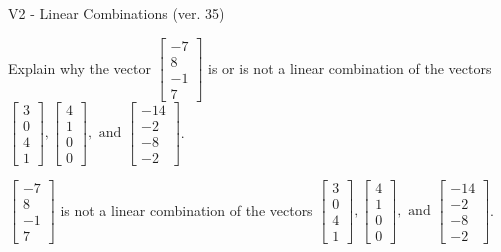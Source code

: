 \begin{exercise}
  \begin{exerciseTitle}V2 - Linear Combinations (ver. 35)\end{exerciseTitle}
  \begin{exerciseStatement}
    Explain why the vector \(\left[\begin{array}{c}
-7 \\
8 \\
-1 \\
7
\end{array}\right]\)  is or is not a linear 
	combination of the vectors \(\left[\begin{array}{c}
3 \\
0 \\
4 \\
1
\end{array}\right] , \left[\begin{array}{c}
4 \\
1 \\
0 \\
0
\end{array}\right] , \text{ and } \left[\begin{array}{c}
-14 \\
-2 \\
-8 \\
-2
\end{array}\right]\).
	


  \end{exerciseStatement}
  \begin{exerciseAnswer}
   \(\left[\begin{array}{c}
-7 \\
8 \\
-1 \\
7
\end{array}\right]\) 
  	 is not  
	a linear combination of the vectors \(\left[\begin{array}{c}
3 \\
0 \\
4 \\
1
\end{array}\right] , \left[\begin{array}{c}
4 \\
1 \\
0 \\
0
\end{array}\right] , \text{ and } \left[\begin{array}{c}
-14 \\
-2 \\
-8 \\
-2
\end{array}\right]\).

	
  


  \end{exerciseAnswer}
\end{exercise}